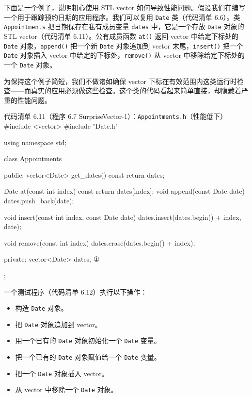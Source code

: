 
下面是一个例子，说明粗心使用 STL vector 如何导致性能问题。假设我们在编写一个用于跟踪预约日期的应用程序。我们可以复用 \texttt{Date} 类（代码清单 6.6）。类 \texttt{Appointments} 把日期保存在私有成员变量 \texttt{dates} 中，它是一个存放 \texttt{Date} 对象的 STL vector（代码清单 6.11）。公有成员函数 \texttt{at()} 返回 vector 中给定下标处的 \texttt{Date} 对象，\texttt{append()} 把一个新 \texttt{Date} 对象追加到 vector 末尾，\texttt{insert()} 把一个 \texttt{Date} 对象插入 vector 中给定的下标处，\texttt{remove()} 从 vector 中移除给定下标处的一个 \texttt{Date} 对象。

为保持这个例子简短，我们不做诸如确保 vector 下标在有效范围内这类运行时检查——而真实的应用必须做这些检查。这个类的代码看起来简单直接，却隐藏着严重的性能问题。

\begin{codeboxt}{代码清单 6.11（程序 6.7 SurpriseVector-1）：\texttt{Appointments.\allowbreak{}h}（性能低下）}
#include <vector>
#include "Date.h"

using namespace std;

class Appointments
{
public:
    vector<Date> get_dates() const { return dates; }

    Date at(const int index) const { return dates[index]; }
    void append(const Date date)   { dates.push_back(date); }

    void insert(const int index, const Date date)
    {
        dates.insert(dates.begin() + index, date);
    }

    void remove(const int index)
    {
        dates.erase(dates.begin() + index);
    }

private:
    vector<Date> dates;       ①
};
\end{codeboxt}
\par

一个测试程序（代码清单 6.12）执行以下操作：

\begin{itemize}
\item 构造 \texttt{Date} 对象。
\item 把 \texttt{Date} 对象追加到 vector。
\item 用一个已有的 \texttt{Date} 对象初始化一个 \texttt{Date} 变量。
\item 把一个已有的 \texttt{Date} 对象赋值给一个 \texttt{Date} 变量。
\item 把一个 \texttt{Date} 对象插入 vector。
\item 从 vector 中移除一个 \texttt{Date} 对象。
\end{itemize}

